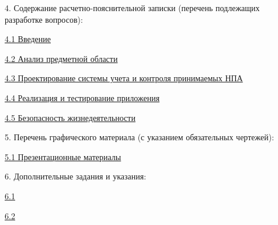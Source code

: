 4. Содержание расчетно-пояснительной записки (перечень подлежащих разработке вопросов):

\begin{addmargin}[1.25cm]{0.1cm}

	\noindent
	\uline{4.1 Введение\hfill}

	\noindent
	\uline{4.2 Анализ предметной области\hfill}

	\noindent
	\uline{4.3 Проектирование системы учета и контроля принимаемых НПА\hfill}

	\noindent
	\uline{4.4 Реализация и тестирование приложения\hfill}

	\noindent
	\uline{4.5 Безопасность жизнедеятельности\hfill}
\end{addmargin}

5. Перечень графического материала (с указанием обязательных чертежей):

\begin{addmargin}[1.25cm]{0.1cm}

	\noindent
	\uline{5.1 Презентационные материалы\hfill}

	\noindent
	\uline{\hfill}
\end{addmargin}

6. Дополнительные задания и указания:

\begin{addmargin}[1.25cm]{0.1cm}

	\noindent
	\uline{6.1 \hfill}

	\noindent
	\uline{6.2 \hfill}
\end{addmargin}

